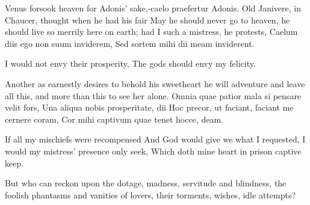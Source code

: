 Venus forsook heaven for Adonis' sake,-caelo praefertur Adonis.
Old Janivere, in Chaucer, thought when he had his fair May he should
never go to heaven, he should live so merrily here on earth; had I such
a mistress, he protests,
Caelum diis ego non suum inviderem,
Sed sortem mihi dii meam inviderent.

I would not envy their prosperity,
The gods should envy my felicity.

Another as earnestly desires to behold his sweetheart he will adventure
and leave all this, and more than this to see her alone.
Omnia quae patior mala si pensare velit fors,
Una aliqua nobis prosperitate, dii
Hoc precor, ut faciant, faciant me cernere coram,
Cor mihi captivum quae tenet hocce, deam.

If all my mischiefs were recompensed
And God would give we what I requested,
I would my mistress' presence only seek,
Which doth mine heart in prison captive keep.

But who can reckon upon the dotage, madness, servitude and blindness,
the foolish phantasms and vanities of lovers, their torments, wishes,
idle attempts?

